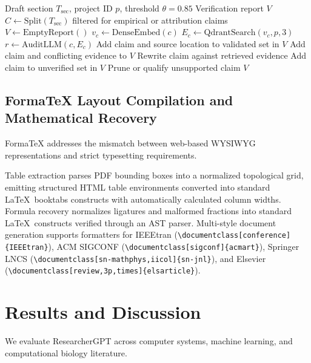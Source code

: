 \documentclass[conference]{IEEEtran}
\begin{document}
\begin{algorithm}[!t]
\caption{Real-Time Claim Extraction and Multi-Hop Grounding}
\label{alg:fact}
\begin{algorithmic}[1]
\Require Draft section $T_{\mathrm{sec}}$, project ID $p$, threshold $\theta = 0.85$
\Ensure Verification report $V$
\State $C \gets \mathrm{Split}(T_{\mathrm{sec}})$ filtered for empirical or attribution claims
\State $V \gets \mathrm{EmptyReport}()$
  \State $v_c \gets \mathrm{DenseEmbed}(c)$
  \State $E_c \gets \mathrm{QdrantSearch}(v_c, p, 3)$
  \State $r \gets \mathrm{AuditLLM}(c, E_c)$
    \State Add claim and source location to validated set in $V$
    \State Add claim and conflicting evidence to $V$
    \State Rewrite claim against retrieved evidence
  \Else
    \State Add claim to unverified set in $V$
    \State Prune or qualify unsupported claim
  \EndIf
\EndFor
\State \Return $V$
\end{algorithmic}
\end{algorithm}

\subsection{FormaTeX Layout Compilation and Mathematical Recovery}
FormaTeX addresses the mismatch between web-based WYSIWYG representations and strict typesetting requirements.

 Table extraction parses PDF bounding boxes into a normalized topological grid, emitting structured HTML table environments converted into standard \LaTeX\ booktabs constructs with automatically calculated column widths. Formula recovery normalizes ligatures and malformed fractions into standard \LaTeX\ constructs verified through an AST parser. Multi-style document generation supports formatters for IEEEtran (\verb|\documentclass[conference]{IEEEtran}|), ACM SIGCONF (\verb|\documentclass[sigconf]{acmart}|), Springer LNCS (\verb|\documentclass[sn-mathphys,iicol]{sn-jnl}|), and Elsevier (\verb|\documentclass[review,3p,times]{elsarticle}|).

\section{Results and Discussion}
We evaluate ResearcherGPT across computer systems, machine learning, and computational biology literature.
\end{document}
